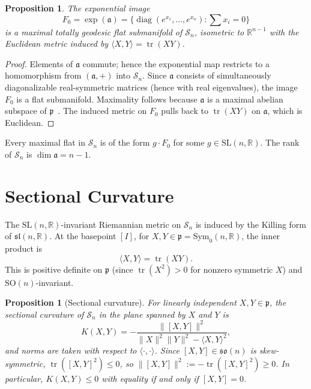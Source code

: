 \documentclass[12pt]{article}
\newtheorem{proposition}[theorem]{Proposition}
\theoremstyle{definition}
\theoremstyle{remark}
\newcommand{\R}{\mathbb{R}}
\newcommand{\SL}{\mathrm{SL}}
\newcommand{\SO}{\mathrm{SO}}
\newcommand{\Symz}{\mathrm{Sym}_{0}}
\newcommand{\calM}{\mathcal{S}}
\newcommand{\tr}{\operatorname{tr}}
\newcommand{\diag}{\operatorname{diag}}
\begin{document}
\begin{proposition}
\label{prop:flat}
The exponential image
\[
  F_0 = \exp(\mathfrak{a})
  = \{\diag(e^{x_1},\ldots,e^{x_n}) : \textstyle\sum x_i = 0\}
\]
is a maximal totally geodesic flat submanifold of $\calM_n$,
isometric to $\R^{n-1}$ with the Euclidean metric induced by
$\langle X, Y\rangle = \tr(XY)$.
\end{proposition}

\begin{proof}
Elements of $\mathfrak{a}$ commute; hence the exponential map
restricts to a homomorphism from $(\mathfrak{a}, +)$ into $\calM_n$.
Since $\mathfrak{a}$ consists of simultaneously diagonalizable
real-symmetric matrices (hence with real eigenvalues), the image
$F_0$ is a flat submanifold.
Maximality follows because $\mathfrak{a}$ is a maximal abelian
subspace of $\mathfrak{p}$~\cite[Ch.~V]{Helgason}.
The induced metric on $F_0$ pulls back to $\tr(XY)$ on $\mathfrak{a}$,
which is Euclidean.
\end{proof}

Every maximal flat in $\calM_n$ is of the form $g \cdot F_0$ for some
$g \in \SL(n,\R)$.
The rank of $\calM_n$ is $\dim \mathfrak{a} = n-1$.

\section{Sectional Curvature}
\label{sec:curvature}

The $\SL(n,\R)$-invariant Riemannian metric on $\calM_n$ is induced
by the Killing form of $\mathfrak{sl}(n,\R)$.
At the basepoint $[I]$, for $X, Y \in \mathfrak{p} = \Symz(n,\R)$,
the inner product is
\[
  \langle X, Y \rangle = \tr(XY).
\]
This is positive definite on $\mathfrak{p}$ (since $\tr(X^2) > 0$
for nonzero symmetric $X$) and $\SO(n)$-invariant.

\begin{proposition}[Sectional curvature]
\label{prop:curvature}
For linearly independent $X, Y \in \mathfrak{p}$, the sectional
curvature of $\calM_n$ in the plane spanned by $X$ and $Y$ is
\[
  K(X,Y) = -\frac{\|[X,Y]\|^2}{\|X\|^2\|Y\|^2 - \langle X,Y\rangle^2},
\]
and norms are taken with respect to $\langle\cdot,\cdot\rangle$.
Since $[X,Y] \in \mathfrak{so}(n)$ is skew-symmetric,
$\tr([X,Y]^2) \leq 0$, so $\|[X,Y]\|^2 := -\tr([X,Y]^2) \geq 0$.
In particular, $K(X,Y) \leq 0$ with equality if and only if
$[X,Y] = 0$.
\end{proposition}
\end{document}
